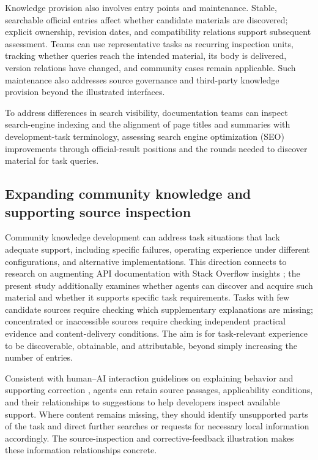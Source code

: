 \documentclass[manuscript,review,anonymous]{acmart}
\begin{document}
Knowledge provision also involves entry points and maintenance. Stable, searchable official entries affect whether candidate materials are discovered; explicit ownership, revision dates, and compatibility relations support subsequent assessment. Teams can use representative tasks as recurring inspection units, tracking whether queries reach the intended material, its body is delivered, version relations have changed, and community cases remain applicable. Such maintenance also addresses source governance and third-party knowledge provision beyond the illustrated interfaces.

To address differences in search visibility, documentation teams can inspect search-engine indexing and the alignment of page titles and summaries with development-task terminology, assessing search engine optimization (SEO) improvements through official-result positions and the rounds needed to discover material for task queries.

\subsection{Expanding community knowledge and supporting source inspection}\label{expanding-community-knowledge-and-supporting-source-inspection}

Community knowledge development can address task situations that lack adequate support, including specific failures, operating experience under different configurations, and alternative implementations. This direction connects to research on augmenting API documentation with Stack Overflow insights \citep{treude2016}; the present study additionally examines whether agents can discover and acquire such material and whether it supports specific task requirements. Tasks with few candidate sources require checking which supplementary explanations are missing; concentrated or inaccessible sources require checking independent practical evidence and content-delivery conditions. The aim is for task-relevant experience to be discoverable, obtainable, and attributable, beyond simply increasing the number of entries.

Consistent with human--AI interaction guidelines on explaining behavior and supporting correction \citep{amershi2019}, agents can retain source passages, applicability conditions, and their relationships to suggestions to help developers inspect available support. Where content remains missing, they should identify unsupported parts of the task and direct further searches or requests for necessary local information accordingly. The source-inspection and corrective-feedback illustration makes these information relationships concrete.
\end{document}
